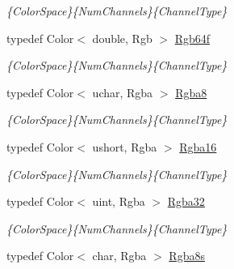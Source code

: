 \begin{DoxyCompactItemize}
\begin{DoxyCompactList}\small\item\em \{Color\-Space\}\{Num\-Channels\}\{Channel\-Type\} \end{DoxyCompactList}\item 
\hypertarget{group___color_types_ga564d3f6442c74e10c56db1b4a6780c1d}{typedef Color$<$ double, Rgb $>$ \hyperlink{group___color_types_ga564d3f6442c74e10c56db1b4a6780c1d}{Rgb64f}}\label{group___color_types_ga564d3f6442c74e10c56db1b4a6780c1d}

\begin{DoxyCompactList}\small\item\em \{Color\-Space\}\{Num\-Channels\}\{Channel\-Type\} \end{DoxyCompactList}\item 
\hypertarget{group___color_types_ga0b72bc5ac8b06e7922dc77fe7d562409}{typedef Color$<$ uchar, Rgba $>$ \hyperlink{group___color_types_ga0b72bc5ac8b06e7922dc77fe7d562409}{Rgba8}}\label{group___color_types_ga0b72bc5ac8b06e7922dc77fe7d562409}

\begin{DoxyCompactList}\small\item\em \{Color\-Space\}\{Num\-Channels\}\{Channel\-Type\} \end{DoxyCompactList}\item 
\hypertarget{group___color_types_gafe0d190af7ced9c6b25b34575a0b99bc}{typedef Color$<$ ushort, Rgba $>$ \hyperlink{group___color_types_gafe0d190af7ced9c6b25b34575a0b99bc}{Rgba16}}\label{group___color_types_gafe0d190af7ced9c6b25b34575a0b99bc}

\begin{DoxyCompactList}\small\item\em \{Color\-Space\}\{Num\-Channels\}\{Channel\-Type\} \end{DoxyCompactList}\item 
\hypertarget{group___color_types_ga43fbd0127f8761972d72fdd724ed3d08}{typedef Color$<$ uint, Rgba $>$ \hyperlink{group___color_types_ga43fbd0127f8761972d72fdd724ed3d08}{Rgba32}}\label{group___color_types_ga43fbd0127f8761972d72fdd724ed3d08}

\begin{DoxyCompactList}\small\item\em \{Color\-Space\}\{Num\-Channels\}\{Channel\-Type\} \end{DoxyCompactList}\item 
\hypertarget{group___color_types_ga3d7f17a4ee02f29a468f5abb3ce924df}{typedef Color$<$ char, Rgba $>$ \hyperlink{group___color_types_ga3d7f17a4ee02f29a468f5abb3ce924df}{Rgba8s}}\label{group___color_types_ga3d7f17a4ee02f29a468f5abb3ce924df}


\end{DoxyCompactItemize}
